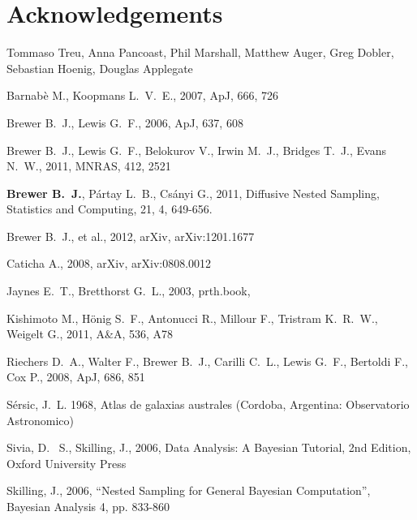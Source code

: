 \documentclass[letterpaper, 11pt]{article}
\begin{document}
\section*{Acknowledgements}
Tommaso Treu, Anna Pancoast, Phil Marshall, Matthew Auger, Greg Dobler, Sebastian Hoenig, Douglas Applegate


\begin{thebibliography}{99}
 Barnab{\`e} M., Koopmans L.~V.~E., 2007, ApJ, 666, 726 

 Brewer B.~J., Lewis G.~F., 2006, ApJ, 637, 608 

Brewer B.~J., Lewis G.~F., Belokurov V., Irwin M.~J., Bridges T.~J., Evans 
N.~W., 2011, MNRAS, 412, 2521 

 {\bf Brewer B.~J.}, P{\'a}rtay L.~B., Cs{\'a}nyi G., 2011, Diffusive Nested Sampling, 
Statistics and Computing, 21, 4, 649-656.

Brewer B.~J., et al., 2012, arXiv, arXiv:1201.1677 

Caticha A., 2008, arXiv, arXiv:0808.0012 

 Jaynes E.~T., Bretthorst G.~L., 2003, prth.book,  

 Kishimoto M., H{\"o}nig S.~F., Antonucci R., Millour F., Tristram K.~R.~W., Weigelt G., 2011, A\&A, 536, A78 

 Riechers D.~A., Walter F., Brewer B.~J., 
Carilli C.~L., Lewis G.~F., Bertoldi F., Cox P., 2008, ApJ, 686, 851 

{S{\'e}rsic}, J.~L. 1968, {Atlas de galaxias australes} (Cordoba, Argentina:
  Observatorio Astronomico)


 Sivia, 
D.~ S., Skilling, J., 2006, Data Analysis: A Bayesian Tutorial, 2nd 
Edition, Oxford University Press

 Skilling, 
J., 2006, ``Nested Sampling for General Bayesian Computation'', Bayesian 
Analysis 4, pp. 833-860


\end{thebibliography}
\end{document}
